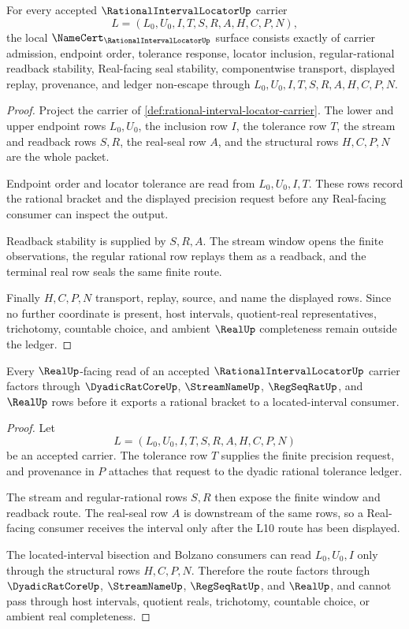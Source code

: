 \begin{theorem}
\label{thm:rational-interval-locator-namecert-obligations}
For every accepted $\RationalIntervalLocatorUp$ carrier
$$
L=(L_0,U_0,I,T,S,R,A,H,C,P,N),
$$
the local $\NameCert_{\RationalIntervalLocatorUp}$ surface consists exactly of carrier admission, endpoint order, tolerance response, locator inclusion, regular-rational readback stability, Real-facing seal stability, componentwise transport, displayed replay, provenance, and ledger non-escape through $L_0,U_0,I,T,S,R,A,H,C,P,N$.
\end{theorem}
\begin{proof}
Project the carrier of \autoref{def:rational-interval-locator-carrier}. The lower and upper endpoint rows $L_0,U_0$, the inclusion row $I$, the tolerance row $T$, the stream and readback rows $S,R$, the real-seal row $A$, and the structural rows $H,C,P,N$ are the whole packet.

Endpoint order and locator tolerance are read from $L_0,U_0,I,T$. These rows record the rational bracket and the displayed precision request before any Real-facing consumer can inspect the output.

Readback stability is supplied by $S,R,A$. The stream window opens the finite observations, the regular rational row replays them as a readback, and the terminal real row seals the same finite route.

Finally $H,C,P,N$ transport, replay, source, and name the displayed rows. Since no further coordinate is present, host intervals, quotient-real representatives, trichotomy, countable choice, and ambient $\RealUp$ completeness remain outside the ledger.
\end{proof}

\begin{theorem}
\label{thm:rational-interval-locator-real-readback}
Every $\RealUp$-facing read of an accepted $\RationalIntervalLocatorUp$ carrier factors through $\DyadicRatCoreUp$, $\StreamNameUp$, $\RegSeqRatUp$, and $\RealUp$ rows before it exports a rational bracket to a located-interval consumer.
\end{theorem}
\begin{proof}
Let
$$
L=(L_0,U_0,I,T,S,R,A,H,C,P,N)
$$
be an accepted carrier. The tolerance row $T$ supplies the finite precision request, and provenance in $P$ attaches that request to the dyadic rational tolerance ledger.

The stream and regular-rational rows $S,R$ then expose the finite window and readback route. The real-seal row $A$ is downstream of the same rows, so a Real-facing consumer receives the interval only after the L10 route has been displayed.

The located-interval bisection and Bolzano consumers can read $L_0,U_0,I$ only through the structural rows $H,C,P,N$. Therefore the route factors through $\DyadicRatCoreUp$, $\StreamNameUp$, $\RegSeqRatUp$, and $\RealUp$, and cannot pass through host intervals, quotient reals, trichotomy, countable choice, or ambient real completeness.
\end{proof}

